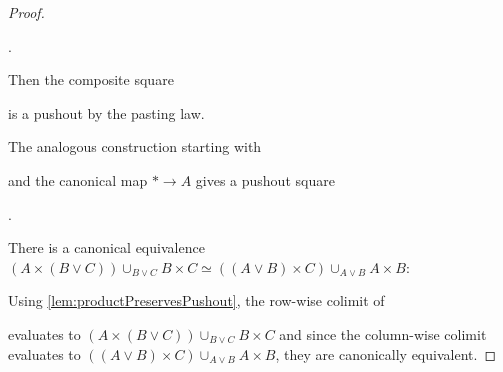 \begin{lemma}
\begin{proof}
\begin{center}
\;.
        \end{center}
        Then the composite square
        \begin{center}
        \end{center}
        is a pushout by the pasting law.

        The analogous construction starting with 
        \begin{center}
        \end{center} 
        and the canonical map $*\to A$ gives a pushout square
        \begin{center}
            \;.
        \end{center}
        There is a canonical equivalence $\left(A\times(B\vee C)\right)\cup_{B\vee C} B\times C\simeq \left((A\vee B)\times C\right)\cup_{A\vee B} A\times B$:

        Using \cref{lem:productPreservesPushout}, the row-wise colimit of 
        \begin{center}
        \end{center}
        evaluates to $\left(A\times(B\vee C)\right)\cup_{B\vee C} B\times C$ and since the column-wise colimit evaluates to $\left((A\vee B)\times C\right)\cup_{A\vee B}A\times B$, they are canonically equivalent.


\end{proof}
\end{lemma}
